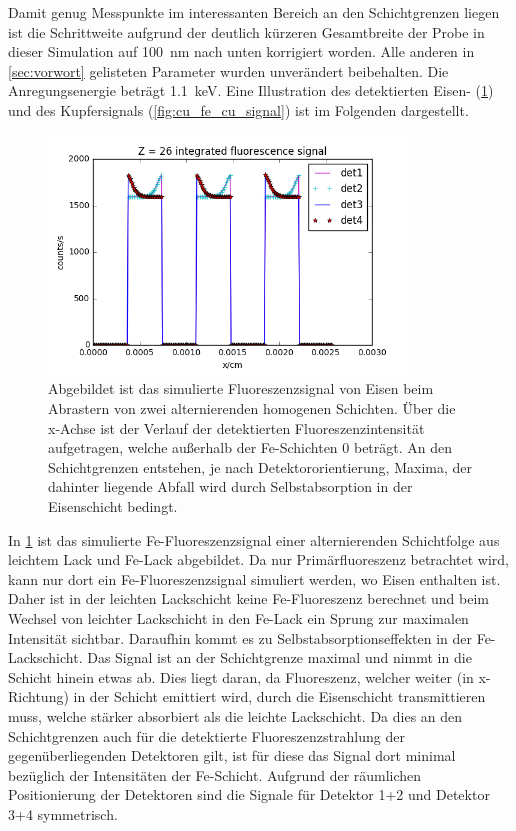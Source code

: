 Damit genug Messpunkte im interessanten Bereich an den Schichtgrenzen liegen ist die Schrittweite aufgrund der deutlich kürzeren Gesamtbreite der Probe in dieser Simulation auf \SI{100}{\nano\meter} nach unten korrigiert worden. Alle anderen in \cref{sec:vorwort} gelisteten Parameter wurden unverändert beibehalten. Die Anregungsenergie beträgt \SI{1.1}{\kilo\electronvolt}. Eine Illustration des detektierten Eisen- (\cref{fig:cu_fe_fe_signal}) und des Kupfersignals (\cref{fig:cu_fe_cu_signal}) ist im Folgenden dargestellt.

\begin{figure}[H] 
  \centering
     \includegraphics[width=0.85\textwidth]{illustrations/cu_fe_fe_signal.png}
  \caption[Simuliertes Eisensignal über Kupferkante]{Abgebildet ist das simulierte Fluoreszenzsignal von Eisen beim Abrastern von zwei alternierenden homogenen Schichten. Über die x-Achse ist der Verlauf der detektierten Fluoreszenzintensität aufgetragen, welche außerhalb der Fe-Schichten 0 beträgt. An den Schichtgrenzen entstehen, je nach Detektororientierung, Maxima, der dahinter liegende Abfall wird durch Selbstabsorption in der Eisenschicht bedingt. }
  \label{fig:cu_fe_fe_signal}
\end{figure}

In \cref{fig:cu_fe_fe_signal} ist das simulierte Fe-Fluoreszenzsignal einer alternierenden Schichtfolge aus leichtem Lack und Fe-Lack abgebildet. Da nur Primärfluoreszenz betrachtet wird, kann nur dort ein Fe-Fluoreszenzsignal simuliert werden, wo Eisen enthalten ist. Daher ist in der leichten Lackschicht keine Fe-Fluoreszenz berechnet und beim Wechsel von leichter Lackschicht in den Fe-Lack ein Sprung zur maximalen Intensität sichtbar. Daraufhin kommt es zu Selbstabsorptionseffekten in der Fe-Lackschicht. Das Signal ist an der Schichtgrenze maximal und nimmt in die Schicht hinein etwas ab. Dies liegt daran, da Fluoreszenz, welcher weiter (in x-Richtung) in der Schicht emittiert wird, durch die Eisenschicht transmittieren muss, welche stärker absorbiert als die leichte Lackschicht. Da dies an den Schichtgrenzen auch für die detektierte Fluoreszenzstrahlung der gegenüberliegenden Detektoren gilt, ist für diese das Signal dort minimal bezüglich der Intensitäten der Fe-Schicht. Aufgrund der räumlichen Positionierung der Detektoren sind die Signale für Detektor 1+2 und Detektor 3+4 symmetrisch. \newline

